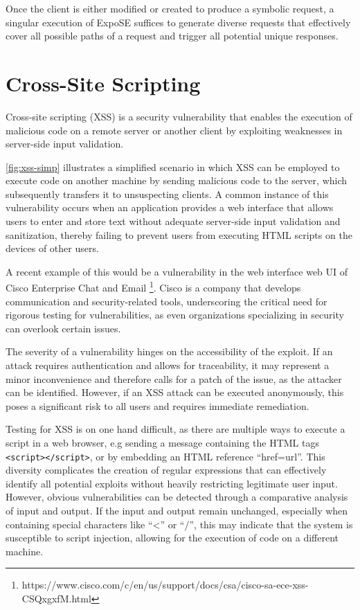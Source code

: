 Once the client is either modified or created to produce a symbolic request, a singular execution of ExpoSE suffices to generate diverse requests that effectively cover all possible paths of a request and trigger all potential unique responses.




\section{Cross-Site Scripting}
\label{sec:xss}
Cross-site scripting (XSS) is a security vulnerability that enables the execution of malicious code on a remote server or another client by exploiting weaknesses in server-side input validation. \cite{bisht_xss-guard_2008}

\autoref{fig:xss-simp} illustrates a simplified scenario in which XSS can be employed to execute code on another machine by sending malicious code to the server, which subsequently transfers it to unsuspecting clients. A common instance of this vulnerability occurs when an application provides a web interface that allows users to enter and store text without adequate server-side input validation and sanitization, thereby failing to prevent users from executing HTML scripts on the devices of other users.\

A recent example of this would be a vulnerability in the web interface web UI of Cisco Enterprise Chat and Email \footnote{https://www.cisco.com/c/en/us/support/docs/csa/cisco-sa-ece-xss-CSQxgxfM.html}. Cisco is a company that develops communication and security-related tools, underscoring the critical need for rigorous testing for vulnerabilities, as even organizations specializing in security can overlook certain issues.

The severity of a vulnerability hinges on the accessibility of the exploit. If an attack requires authentication and allows for traceability, it may represent a minor inconvenience and therefore calls for a patch of the issue, as the attacker can be identified. However, if an XSS attack can be executed anonymously, this poses a significant risk to all users and requires immediate remediation.

Testing for XSS is on one hand difficult, as there are multiple ways to execute a script in a web browser, e.g sending a message containing the HTML tags \lstinline{<script></script>}, or by embedding an HTML reference “href=url”. This diversity complicates the creation of regular expressions that can effectively identify all potential exploits without heavily restricting legitimate user input. However, obvious vulnerabilities can be detected through a comparative analysis of input and output. If the input and output remain unchanged, especially when containing special characters like “\textless” or “/”, this may indicate that the system is susceptible to script injection, allowing for the execution of code on a different machine.


